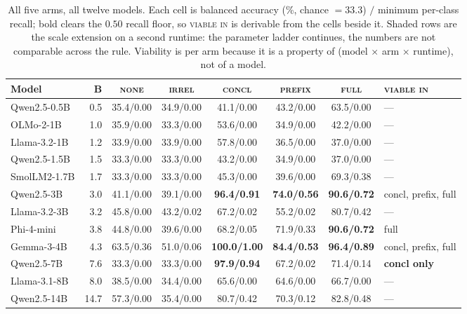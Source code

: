 \documentclass[10pt,twocolumn]{article}
\begin{document}
\begin{table}[tb]
\centering\small
\caption{All five arms, all twelve models. Each cell is balanced accuracy
(\%, chance $=33.3$) $/$ minimum per-class recall; bold clears the $0.50$ recall
floor, so \textsc{viable in} is derivable from the cells beside it. Shaded rows
are the scale extension on a second runtime: the parameter
ladder continues, the numbers are not comparable across the rule. Viability is
per arm because it is a property of (model $\times$ arm $\times$ runtime), not of
a model.}
\label{tab:models}
\begin{tabular}{lrccccc@{\hskip 1em}l}
\toprule
Model & B & \textsc{none} & \textsc{irrel} & \textsc{concl} & \textsc{prefix} & \textsc{full} & \textsc{viable in} \\
\midrule
Qwen2.5-0.5B &  0.5 & 35.4/0.00 & 34.9/0.00 & 41.1/0.00 & 43.2/0.00 & 63.5/0.00 & --- \\
OLMo-2-1B    &  1.0 & 35.9/0.00 & 33.3/0.00 & 53.6/0.00 & 34.9/0.00 & 42.2/0.00 & --- \\
Llama-3.2-1B &  1.2 & 33.9/0.00 & 33.9/0.00 & 57.8/0.00 & 36.5/0.00 & 37.0/0.00 & --- \\
Qwen2.5-1.5B &  1.5 & 33.3/0.00 & 33.3/0.00 & 43.2/0.00 & 34.9/0.00 & 37.0/0.00 & --- \\
SmolLM2-1.7B &  1.7 & 33.3/0.00 & 33.3/0.00 & 45.3/0.00 & 39.6/0.00 & 69.3/0.38 & --- \\
Qwen2.5-3B   &  3.0 & 41.1/0.00 & 39.1/0.00 & \textbf{96.4/0.91} & \textbf{74.0/0.56} & \textbf{90.6/0.72} & concl, prefix, full \\
Llama-3.2-3B &  3.2 & 45.8/0.00 & 43.2/0.02 & 67.2/0.02 & 55.2/0.02 & 80.7/0.42 & --- \\
Phi-4-mini   &  3.8 & 44.8/0.00 & 39.6/0.00 & 68.2/0.05 & 71.9/0.33 & \textbf{90.6/0.72} & full \\
Gemma-3-4B   &  4.3 & 63.5/0.36 & 51.0/0.06 & \textbf{100.0/1.00} & \textbf{84.4/0.53} & \textbf{96.4/0.89} & concl, prefix, full \\
Qwen2.5-7B   &  7.6 & 33.3/0.00 & 33.3/0.00 & \textbf{97.9/0.94} & 67.2/0.02 & 71.4/0.14 & \textbf{concl only} \\
\midrule
\rowcolor{black!7} Llama-3.1-8B &  8.0 & 38.5/0.00 & 34.4/0.00 & 65.6/0.00 & 64.6/0.00 & 66.7/0.00 & --- \\
\rowcolor{black!7} Qwen2.5-14B  & 14.7 & 57.3/0.00 & 35.4/0.00 & 80.7/0.42 & 70.3/0.12 & 82.8/0.48 & --- \\
\bottomrule
\end{tabular}
\end{table}
\end{document}
